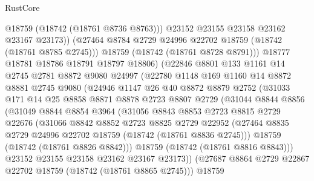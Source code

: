 \begin{lexlean}{RustCore}
\begin{coremodule}
                      @18759
                      (@18742 (@18761 @8736 @8763)))
                    @23152
                    @23155
                    @23158
                    @23162
                    @23167
                    @23173))
                (@27464 @8784 @2729 @24996 @22702 @18759 (@18742 (@18761 @8785 @2745)))
                @18759
                (@18742 (@18761 @8728 @8791)))
              @18777
              @18781
              @18786
              @18791
              @18797
              @18806)
            (@22846
              @8801
              @133
              @1161
              @14
              @2745
              @2781
              @8872
              @9080
              @24997
              (@22780
                @1148
                @169
                @1160
                @14
                @8872
                @8881
                @2745
                @9080
                (@24946
                  @1147
                  @26
                  @40
                  @8872
                  @8879
                  @2752
                  (@31033
                    @171
                    @14
                    @25
                    @8858
                    @8871
                    @8878
                    @2723
                    @8807
                    @2729
                    (@31044
                      @8844
                      @8856
                      (@31049
                        @8844
                        @8854
                        @3964
                        (@31056
                          @8843
                          @8853
                          @2723
                          @8815
                          @2729
                          @22676
                          (@31066
                            @8842
                            @8852
                            @2723
                            @8825
                            @2729
                            @22952
                            (@27464 @8835 @2729 @24996 @22702 @18759 (@18742 (@18761 @8836 @2745)))
                            @18759
                            (@18742 (@18761 @8826 @8842)))
                          @18759
                          (@18742 (@18761 @8816 @8843)))
                        @23152
                        @23155
                        @23158
                        @23162
                        @23167
                        @23173))
                    (@27687 @8864 @2729 @22867 @22702 @18759 (@18742 (@18761 @8865 @2745)))
                    @18759

\end{coremodule}
\end{lexlean}

